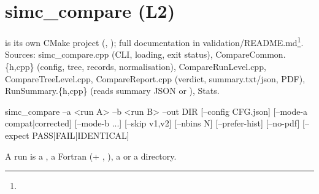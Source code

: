 \section{\texorpdfstring{simc\_\allowbreak{}compare (L2)}{simc\_\allowbreak{}compare (L2)}}\label{translation_report-02u5fvalidation:25-simcu5fcompare-l2}
 is its own CMake project (, ); full documentation in
validation/\allowbreak{}README.md\footnote{}. Sources: simc\_\allowbreak{}compare.\allowbreak{}cpp (CLI, loading, exit status),
CompareCommon.\{h,\allowbreak{}cpp\} (config, tree, records, normalisation),\allowbreak{} CompareRunLevel.\allowbreak{}cpp,\allowbreak{} CompareTreeLevel.\allowbreak{}cpp,\allowbreak{}
CompareReport.\allowbreak{}cpp (verdict, summary.\allowbreak{}txt/\allowbreak{}json,\allowbreak{} PDF), RunSummary.\{h,\allowbreak{}cpp\} (reads summary JSON or ), Stats.

\begin{simcplain}[basicstyle=\ttfamily\tiny]
simc_compare --a <run A> --b <run B> --out DIR [--config CFG.json] [--mode-a compat|corrected] [--mode-b ...]
             [--skip v1,v2] [--nbins N] [--prefer-hist] [--no-pdf] [--expect PASS|FAIL|IDENTICAL]
\end{simcplain}
A run is a , a Fortran  (+ , ), a  or a directory.


